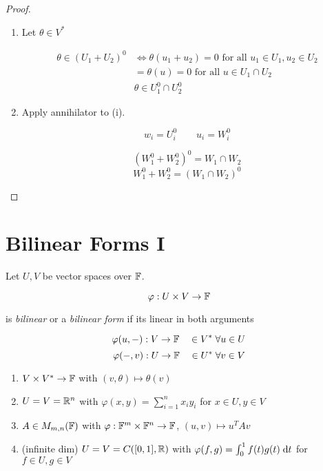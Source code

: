 \documentclass[a4paper]{article}
\begin{document}
\begin{proof}
	\begin{enumerate}
		\item Let $ \theta \in V^{*} $
		
		\begin{align*}
		\theta \in (U_{1} + U_{2})^{0} & \iff \theta(u_{1} + u_{2}) = 0 \text{ for all } u_{1} \in U_{1},u_{2} \in U_{2} \\
		& = \theta(u) = 0 \text{ for all } u \in U_{1} \cap U_{2} \\
		& \theta \in U_{1}^{0} \cap U_{2}^{0}
 		\end{align*}
		
		\item Apply annihilator to (i).
		
		\[ w_{i} = U_{i}^{0} \qquad u_{i} = W_{i}^{0} \]
		
		\[ (W_{1}^{0} + W_{2}^{0} )^{0} = W_{1} \cap W_{2} \]
		\[ W_{1}^{0} + W_{2}^{0} = (W_{1} \cap W_{2} )^{0} \]
		
	\end{enumerate}
\end{proof}



\section{Bilinear Forms I}

\begin{defi}
	Let $ U,V $ be vector spaces over $ \mathbb{F} $.
	
	\[ \varphi : U \times V \to \mathbb{F} \]
	
	is \emph{bilinear} or a \emph{bilinear form} if its linear in both arguments
	
	\[ \varphi(u,-) : V \to \mathbb{F} \quad \in V^{*} \; \forall u \in U \]
	\[ \varphi(-,v) : U \to \mathbb{F} \quad \in U^{*} \; \forall v \in V \]
\end{defi}

\begin{eg}
	\begin{enumerate}
		\item $ V \times V^{*} \to \mathbb{F} $ with $ (v,\theta) \mapsto \theta(v) $
		
		\item $ U = V = \mathbb{R}^{n} $ with $ \varphi(x,y) = \sum_{i=1}^{n} x_{i} y_{i} $ for $ x \in U, y \in V $
		\item $ A \in M_{m,n}(\mathbb{F}) $ with $ \varphi : \mathbb{F}^{m} \times \mathbb{F}^{n} \to \mathbb{F} $, $ (u,v) \mapsto u^{T} A v $
		
		\item (infinite dim) $ U = V = C( [0,1] ,\mathbb{R} ) $ with $ \varphi(f,g) = \int_{0}^{1} f(t) g(t) \; \mathrm{d} t $ for $ f \in U, g \in V $
		
	\end{enumerate}
\end{eg}
\end{document}
